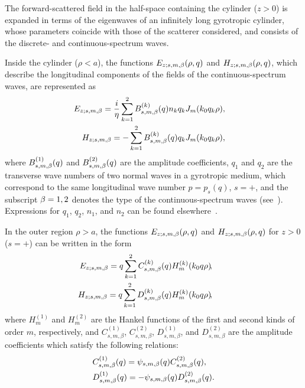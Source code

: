 \documentclass[conference,a4paper]{IEEEtran}
\begin{document}
The forward-scattered field in the half-space containing the cylinder ($z>0$) is expanded in terms of the eigenwaves of an infinitely long gyrotropic cylinder, whose parameters coincide with those of the scatterer considered, and consists of the discrete- and continuous-spectrum waves.

Inside the cylinder ($\rho<a$), the functions $E_{z;s,m,\beta}(\rho, q)$ and $H_{z;s,m,\beta}(\rho, q)$, which describe the longitudinal components of the fields of the continuous-spectrum waves, are re\-pre\-sented as~\cite{Kondratev1999,Eskin2017}
\newcommand{\as}{k_0{q}_k{\rho}}
\newcommand{\az}{\sum_{k=1}^2}
\begin{eqnarray}\label{eq4}
&&\hspace{-7 mm}E_{z;s,m,\b} = \frac{i}{{\eta}} \sum_{k=1}^2
B_{s,m,\b}^{(k)}(q){n}_k{q}_kJ_m(\as),\nonumber\\
&&\hspace{-7 mm}H_{z;s,m,\b} = {-}\sum_{k=1}^2 B_{s,m,\b}^{(k)}(q){q}_kJ_m(\as),
\end{eqnarray}
where $B_{s,m,\beta}^{(1)}(q)$ and $B_{s,m,\beta}^{(2)}(q)$ are the amplitude coefficients, $q_1$ and $q_2$ are the transverse wave numbers of two normal waves in a gyrotropic medium, which correspond to the same longitudinal wave number $p=p_s(q)$, $s=+$, and the subscript $\beta=1,2$ denotes the type of the continuous-spectrum waves (see~\cite{Eskin2017}). Expressions for $q_1$, $q_2$, ${n}_1$, and ${n}_2$ can be found elsewhere~\cite{Kondratev1999}.

In the outer region $\rho >a$, the functions $E_{z;s,m,\beta}(\rho, q)$ and $H_{z;s,m,\beta}(\rho, q)$ for $z>0$ ($s=+$) can be written in the form
\begin{eqnarray}\label{eq5_1}
&&\hspace{-11 mm} E_{z;s,m,\beta} = q \sum_{k=1}^2 C_{s,m,\beta}^{(k)}(q) H_m^{(k)}(k_0 q\rho)\!,\nonumber\\
&&\hspace{-11 mm} H_{z;s,m,\beta} = q  \sum_{k=1}^2D_{s,m,\beta}^{(k)}(q) H_m^{(k)}(k_0 q\rho)\!,
\end{eqnarray}
where $H_m^{(1)}$ and $H_m^{(2)}$ are the Hankel functions of the first and second kinds of order $m$, respectively, and $C_{s,m,\beta}^{(1)}$, $C_{s,m,\beta}^{(2)}$, $D_{s,m,\beta}^{(1)}$, and $D_{s,m,\beta}^{(2)}$ are the amplitude coefficients which satisfy the following relations:
\begin{align}\label{eq5_2}
&C_{s,m,\beta}^{(1)}(q)= \psi_{s,m,\beta}(q) C_{s,m,\beta}^{(2)}(q),\notag\\
&D_{s,m,\beta}^{(1)}(q)={-} \psi_{s,m,\beta}(q) D_{s,m,\beta}^{(2)}(q).
\end{align}
\end{document}
